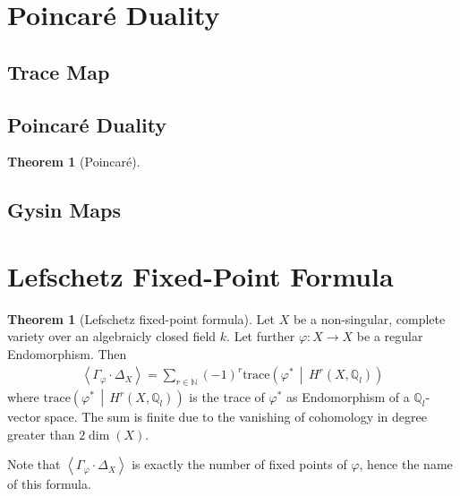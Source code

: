 \documentclass[english]{scrartcl}
\theoremstyle{definition}
\newtheorem{Thm}[Def]{Theorem}
\theoremstyle{remark}
\newcommand*{\N}{\mathds{N}}
\newcommand*{\Z}{\mathds{Z}}
\newcommand*{\Q}{\mathds{Q}}
\newcommand*{\Zl}{\Z_l} %
\newcommand*{\Ql}{\Q_l} %
\newcommand*{\intProd}[2]{{#1\cdot#2}} %
\newcommand*{\intNum}[1]{{\left\langle{#1}\right\rangle}} %
\newcommand*{\Graph}[1]{{\Gamma_{#1}}} %
\newcommand*{\Diag}[1]{{\Delta_{#1}}} %
\newcommand*{\trace}[2]{{\text{trace}\left(#1 \,\middle|\, #2 \right)}} %
\renewcommand*{\phi}{\varphi}
\begin{document}
\section{Poincaré Duality}
\subsection{Trace Map}
\subsection{Poincaré Duality}
\begin{Thm}[Poincaré]
  
\end{Thm}
\subsection{Gysin Maps}

\section{Lefschetz Fixed-Point Formula}

\begin{Thm}[Lefschetz fixed-point formula]\label{lefschetzthm}
  Let $X$ be a non-singular, complete variety over an algebraicly
  closed field $k$.
  Let further $\phi\colon X\to X$ be a regular Endomorphism.
  Then
  \begin{gather*}
    \intNum{\intProd{\Graph{\phi}}{\Diag{X}}}
    = \sum_{r\in\N} (-1)^r \trace{\phi^*}{H^r(X,\Ql)}
  \end{gather*}
  where $\trace{\phi^*}{H^r(X,\Ql)}$ is the trace of $\phi^*$ as
  Endomorphism of a $\Ql$-vector space. 
  The sum is finite due to the vanishing
  of cohomology in degree greater than $2\dim(X)$. 
\end{Thm}
Note that $\intNum{\intProd{\Graph{\phi}}{\Diag{X}}}$ is exactly the number of
fixed points of $\phi$, hence the name of this formula.
\end{document}
